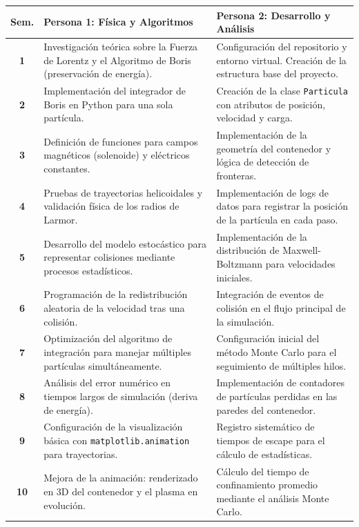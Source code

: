 \documentclass[11pt]{article}
\begin{document}
\begin{table}[H]
\centering
\small
\begin{tabularx}{\textwidth}{|@{}c|X|X|@{}}
\toprule
\textbf{Sem.} & \textbf{Persona 1: Física y Algoritmos} & \textbf{Persona 2: Desarrollo y Análisis} \\ \midrule
\textbf{1} & Investigación teórica sobre la Fuerza de Lorentz y el Algoritmo de Boris (preservación de energía). & Configuración del repositorio y entorno virtual. Creación de la estructura base del proyecto. \\ \midrule
\textbf{2} & Implementación del integrador de Boris en Python para una sola partícula. & Creación de la clase \texttt{Particula} con atributos de posición, velocidad y carga. \\ \midrule
\textbf{3} & Definición de funciones para campos magnéticos (solenoide) y eléctricos constantes. & Implementación de la geometría del contenedor y lógica de detección de fronteras. \\ \midrule
\textbf{4} & Pruebas de trayectorias helicoidales y validación física de los radios de Larmor. & Implementación de logs de datos para registrar la posición de la partícula en cada paso. \\ \midrule
\textbf{5} & Desarrollo del modelo estocástico para representar colisiones mediante procesos estadísticos. & Implementación de la distribución de Maxwell-Boltzmann para velocidades iniciales. \\ \midrule
\textbf{6} & Programación de la redistribución aleatoria de la velocidad tras una colisión. & Integración de eventos de colisión en el flujo principal de la simulación. \\ \midrule
\textbf{7} & Optimización del algoritmo de integración para manejar múltiples partículas simultáneamente. & Configuración inicial del método Monte Carlo para el seguimiento de múltiples hilos. \\ \midrule
\textbf{8} & Análisis del error numérico en tiempos largos de simulación (deriva de energía). & Implementación de contadores de partículas perdidas en las paredes del contenedor. \\ \midrule
\textbf{9} & Configuración de la visualización básica con \texttt{matplotlib.animation} para trayectorias. & Registro sistemático de tiempos de escape para el cálculo de estadísticas. \\ \midrule
\textbf{10} & Mejora de la animación: renderizado en 3D del contenedor y el plasma en evolución. & Cálculo del tiempo de confinamiento promedio mediante el análisis Monte Carlo. \\ \midrule

\end{tabularx}
\end{table}
\end{document}
